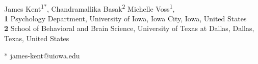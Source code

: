 \documentclass[10pt,letterpaper]{article}
\begin{document}
\vspace*{0.2in}

\begin{flushleft}
{\Large
\textbf{} %
}
\newline
\\
James Kent\textsuperscript{1*},
Chandramallika Basak\textsuperscript{2}
Michelle Voss\textsuperscript{1},
\\
\bigskip
\textbf{1} Psychology Department, University of Iowa, Iowa City, Iowa, United States \\
\textbf{2} School of Behavioral and Brain Science, University of Texas at Dallas, Dallas, Texas, United States
\bigskip

% 
%





* james-kent@uiowa.edu

\end{flushleft}
\end{document}
